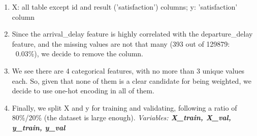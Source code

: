 \begin{enumerate}
	\item X: all table except id and result ('satisfaction') columns;  y: 'satisfaction' column
	\item Since the arrival\_delay feature is highly correlated with the departure\_delay feature, and the missing values are not that many (393 out of 129879: ~0.03\%), we decide to remove the column.
	\item We see there are 4 categorical features, with no more than 3 unique values each. So, given that none of them is a clear candidate for being weighted, we decide to use one-hot encoding in all of them.
	\item Finally, we split X and y for training and validating, following a ratio of 80\%/20\% (the dataset is large enough).
	\subitem \emph{Variables: \textbf{X\_train, X\_val, y\_train, y\_val}}
\end{enumerate}